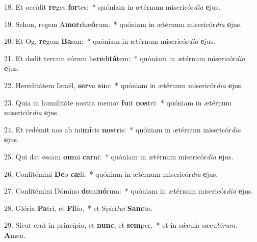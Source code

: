18. Et occídit \textbf{re}ges \textbf{for}tes:~*  quóniam in ætérnum misericór\textit{di}\textit{a} \textbf{e}jus.\

19. Sehon, regem A\textbf{mor}rhæ\textbf{ó}rum:~*  quóniam in ætérnum misericór\textit{di}\textit{a} \textbf{e}jus.\

20. Et Og, \textbf{re}gem \textbf{Ba}san:~*  quóniam in ætérnum misericór\textit{di}\textit{a} \textbf{e}jus.\

21. Et dedit terram eórum he\textbf{re}di\textbf{tá}tem:~*  quóniam in ætérnum misericór\textit{di}\textit{a} \textbf{e}jus.\

22. Hereditátem Israël, \textbf{ser}vo \textbf{su}o:~*  quóniam in ætérnum misericór\textit{di}\textit{a} \textbf{e}jus.\

23. Quia in humilitáte nostra memor \textbf{fu}it \textbf{nos}tri:~*  quóniam in ætérnum misericór\textit{di}\textit{a} \textbf{e}jus.\

24. Et redémit nos ab ini\textbf{mí}cis \textbf{nos}tris:~*  quóniam in ætérnum misericór\textit{di}\textit{a} \textbf{e}jus.\

25. Qui dat escam \textbf{om}ni \textbf{car}ni:~*  quóniam in ætérnum misericór\textit{di}\textit{a} \textbf{e}jus.\

26. Confitémini \textbf{De}o \textbf{cæ}li:~*  quóniam in ætérnum misericór\textit{di}\textit{a} \textbf{e}jus.\

27. Confitémini Dómino \textbf{do}mi\textbf{nó}rum:~*  quóniam in ætérnum misericór\textit{di}\textit{a} \textbf{e}jus.\

28. Glória \textbf{Pa}tri, et \textbf{Fí}lio,~*  et Spirí\textit{tu}\textit{i} \textbf{Sanc}to.\

29. Sicut erat in princípio, et \textbf{nunc}, et \textbf{sem}per,~*  et in sǽcula sæcu\textit{ló}\textit{rum}. \textbf{A}men.\

